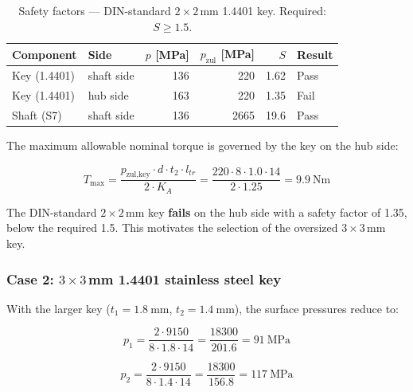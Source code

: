\documentclass[11pt,a4paper,twoside,openright]{book}
\begin{document}
\begin{table}[htbp]
    \centering
    \begin{tabular}{l l r r r l}
        \hline
        \textbf{Component} & \textbf{Side} & $p$ [\si{\mega\pascal}] & $p_{\text{zul}}$ [\si{\mega\pascal}] & $S$ & \textbf{Result} \\
        \hline
        Key (1.4401)    & shaft side & 136 & 220  & 1.62  & Pass \\
        Key (1.4401)    & hub side   & 163 & 220  & 1.35  & Fail \\
        Shaft (S7)      & shaft side & 136 & 2665 & 19.6  & Pass \\
        \hline
    \end{tabular}
    \caption{Safety factors --- DIN-standard $2 \times 2$\,\si{\milli\metre} 1.4401 key. Required: $S \geq 1.5$.}
    \label{tab:sf_2x2}
\end{table}
 
The maximum allowable nominal torque is governed by the key on the hub side:
 
\begin{equation}
    T_{\max} = \frac{p_{\text{zul,key}} \cdot d \cdot t_2 \cdot l_{tr}}{2 \cdot K_A} = \frac{220 \cdot 8 \cdot 1.0 \cdot 14}{2 \cdot 1.25} = \SI{9.9}{\newton\metre}
    \label{eq:t_max_2x2}
\end{equation}
 
The DIN-standard $2 \times 2$\,\si{\milli\metre} key \textbf{fails} on the hub side with a safety factor of 1.35, below the required 1.5. This motivates the selection of the oversized $3 \times 3$\,\si{\milli\metre} key.
 
\subsubsection{Case 2: $3 \times 3$\,\si{\milli\metre} 1.4401 stainless steel key}
 
With the larger key ($t_1 = \SI{1.8}{\milli\metre}$, $t_2 = \SI{1.4}{\milli\metre}$), the surface pressures reduce to:
 
\begin{equation}
    p_1 = \frac{2 \cdot 9150}{8 \cdot 1.8 \cdot 14} = \frac{18300}{201.6} = \SI{91}{\mega\pascal}
    \label{eq:p1_3x3_c45}
\end{equation}
 
\begin{equation}
    p_2 = \frac{2 \cdot 9150}{8 \cdot 1.4 \cdot 14} = \frac{18300}{156.8} = \SI{117}{\mega\pascal}
    \label{eq:p2_3x3_c45}
\end{equation}
 
\end{document}
